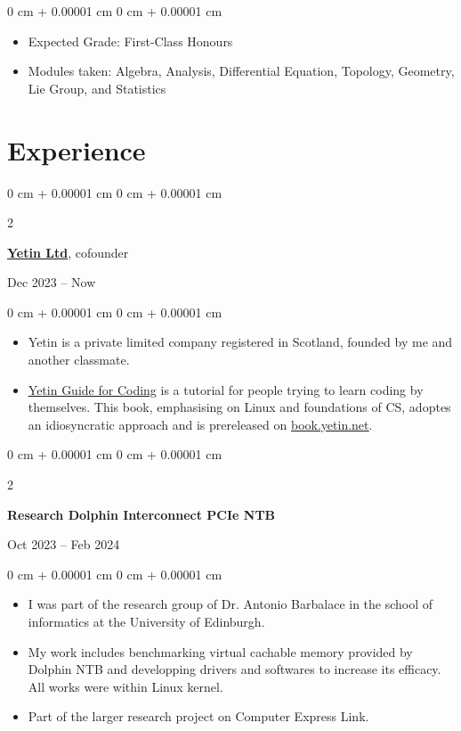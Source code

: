 \documentclass[10pt, a4paper]{article}
\newenvironment{highlights}{
    \begin{itemize}[
        topsep=0.10 cm,
        parsep=0.10 cm,
        partopsep=0pt,
        itemsep=0pt,
        leftmargin=0 cm + 10pt
    ]
}{
    \end{itemize}
} %
\newenvironment{onecolentry}{
    \begin{adjustwidth}{
        0 cm + 0.00001 cm
    }{
        0 cm + 0.00001 cm
    }
}{
    \end{adjustwidth}
} %
\newenvironment{twocolentry}[2][]{
    \onecolentry
    \def\secondColumn{#2}
    \setcolumnwidth{\fill, 4.5 cm}
    \begin{paracol}{2}
}{
    \switchcolumn \raggedleft \secondColumn
    \end{paracol}
    \endonecolentry
} %
\begin{document}
        \vspace{0.10 cm}
        \begin{onecolentry}
            \begin{highlights}
                \item Expected Grade: First-Class Honours
                \item Modules taken: Algebra, Analysis, Differential Equation, Topology, Geometry, Lie Group, and Statistics
            \end{highlights}
        \end{onecolentry}

    
    \section{Experience}

        \begin{twocolentry}{
            Dec 2023 – Now
        }
			\href{https://yetin.net}{\textbf{\underline{Yetin Ltd}}}, cofounder
		\end{twocolentry}
        \vspace{0.10 cm}
        \begin{onecolentry}
            \begin{highlights}
				\item Yetin is a private limited company registered in Scotland, founded by me and another classmate.
				\item \href{https://book.yetin.net}{\underline{Yetin Guide for Coding}} is
					a tutorial for people trying to learn coding by themselves. 
					This book, emphasising on Linux and foundations of CS, adoptes an idiosyncratic approach and is prereleased on \href{https://book.yetin.net}{\underline{book.yetin.net}}.
            \end{highlights}
        \end{onecolentry}

        \vspace{0.2 cm}

        \begin{twocolentry}{
            Oct 2023 – Feb 2024
        }
            \textbf{Research Dolphin Interconnect PCIe NTB}
		\end{twocolentry}
        \vspace{0.10 cm}
        \begin{onecolentry}
            \begin{highlights}
                \item I was part of the research group of Dr. Antonio Barbalace in the school of informatics at the University of Edinburgh.
				\item My work includes benchmarking virtual cachable memory provided by Dolphin NTB and developping drivers and softwares to increase its efficacy.
				All works were within Linux kernel.
				\item Part of the larger research project on Computer Express Link.
            \end{highlights}
        \end{onecolentry}
\end{document}
